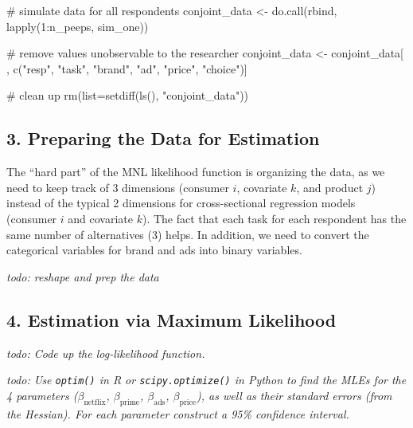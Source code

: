 \documentclass[
  letterpaper,
  DIV=11,
  numbers=noendperiod]{scrartcl}
\newenvironment{Shaded}{\begin{snugshade}}{\end{snugshade}}
\newcommand{\AttributeTok}[1]{\textcolor[rgb]{0.40,0.45,0.13}{#1}}
\newcommand{\CommentTok}[1]{\textcolor[rgb]{0.37,0.37,0.37}{#1}}
\newcommand{\DecValTok}[1]{\textcolor[rgb]{0.68,0.00,0.00}{#1}}
\newcommand{\FunctionTok}[1]{\textcolor[rgb]{0.28,0.35,0.67}{#1}}
\newcommand{\NormalTok}[1]{\textcolor[rgb]{0.00,0.23,0.31}{#1}}
\newcommand{\OtherTok}[1]{\textcolor[rgb]{0.00,0.23,0.31}{#1}}
\newcommand{\SpecialCharTok}[1]{\textcolor[rgb]{0.37,0.37,0.37}{#1}}
\newcommand{\StringTok}[1]{\textcolor[rgb]{0.13,0.47,0.30}{#1}}
\begin{document}
\begin{tcolorbox}
\begin{Shaded}
\begin{Highlighting}[]
\CommentTok{\# simulate data for all respondents}
\NormalTok{conjoint\_data }\OtherTok{\textless{}{-}} \FunctionTok{do.call}\NormalTok{(rbind, }\FunctionTok{lapply}\NormalTok{(}\DecValTok{1}\SpecialCharTok{:}\NormalTok{n\_peeps, sim\_one))}

\CommentTok{\# remove values unobservable to the researcher}
\NormalTok{conjoint\_data }\OtherTok{\textless{}{-}}\NormalTok{ conjoint\_data[ , }\FunctionTok{c}\NormalTok{(}\StringTok{"resp"}\NormalTok{, }\StringTok{"task"}\NormalTok{, }\StringTok{"brand"}\NormalTok{, }\StringTok{"ad"}\NormalTok{, }\StringTok{"price"}\NormalTok{, }\StringTok{"choice"}\NormalTok{)]}

\CommentTok{\# clean up}
\FunctionTok{rm}\NormalTok{(}\AttributeTok{list=}\FunctionTok{setdiff}\NormalTok{(}\FunctionTok{ls}\NormalTok{(), }\StringTok{"conjoint\_data"}\NormalTok{))}
\end{Highlighting}
\end{Shaded}

\end{tcolorbox}

\subsection{3. Preparing the Data for
Estimation}\label{preparing-the-data-for-estimation}

The ``hard part'' of the MNL likelihood function is organizing the data,
as we need to keep track of 3 dimensions (consumer \(i\), covariate
\(k\), and product \(j\)) instead of the typical 2 dimensions for
cross-sectional regression models (consumer \(i\) and covariate \(k\)).
The fact that each task for each respondent has the same number of
alternatives (3) helps. In addition, we need to convert the categorical
variables for brand and ads into binary variables.

\emph{todo: reshape and prep the data}

\subsection{4. Estimation via Maximum
Likelihood}\label{estimation-via-maximum-likelihood}

\emph{todo: Code up the log-likelihood function.}

\emph{todo: Use \texttt{optim()} in R or \texttt{scipy.optimize()} in
Python to find the MLEs for the 4 parameters (\(\beta_\text{netflix}\),
\(\beta_\text{prime}\), \(\beta_\text{ads}\), \(\beta_\text{price}\)),
as well as their standard errors (from the Hessian). For each parameter
construct a 95\% confidence interval.}
\end{document}
